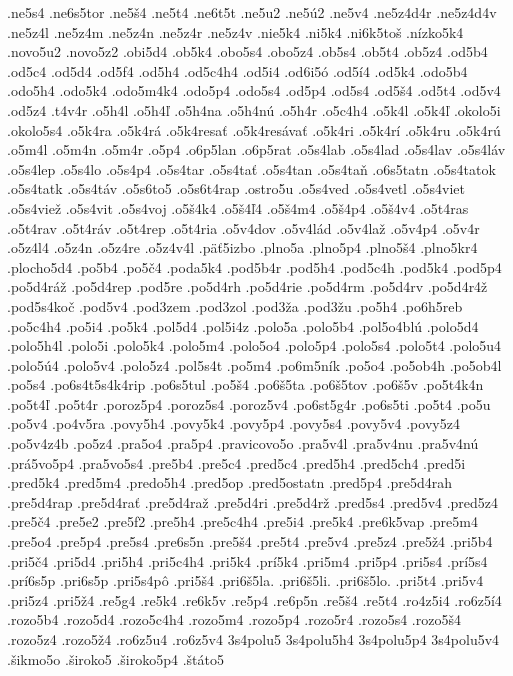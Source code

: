 {.ne5s4
.ne6s5tor
.ne5š4
.ne5t4
.ne6t5t
.ne5u2
.ne5ú2
.ne5v4
.ne5z4d4r
.ne5z4d4v
.ne5z4l
.ne5z4m
.ne5z4n
.ne5z4r
.ne5z4v
.nie5k4
.ni5k4
.ni6k5toš
.nízko5k4
.novo5u2
.novo5z2
.obi5d4
.ob5k4
.obo5s4
.obo5z4
.ob5s4
.ob5t4
.ob5z4
.od5b4
.od5c4
.od5d4
.od5f4
.od5h4
.od5c4h4
.od5i4
.od6i5ó
.od5í4
.od5k4
.odo5b4
.odo5h4
.odo5k4
.odo5m4k4
.odo5p4
.odo5s4
.od5p4
.od5s4
.od5š4
.od5t4
.od5v4
.od5z4
.t4v4r
.o5h4l
.o5h4ľ
.o5h4na
.o5h4nú
.o5h4r
.o5c4h4
.o5k4l
.o5k4ľ
.okolo5i
.okolo5s4
.o5k4ra
.o5k4rá
.o5k4resať
.o5k4resávať
.o5k4ri
.o5k4rí
.o5k4ru
.o5k4rú
.o5m4l
.o5m4n
.o5m4r
.o5p4
.o6p5lan
.o6p5rat
.o5s4lab
.o5s4lad
.o5s4lav
.o5s4láv
.o5s4lep
.o5s4lo
.o5s4p4
.o5s4tar
.o5s4tať
.o5s4tan
.o5s4taň
.o6s5tatn
.o5s4tatok
.o5s4tatk
.o5s4táv
.o5s6to5
.o5s6t4rap
.ostro5u
.o5s4ved
.o5s4vetl
.o5s4viet
.o5s4viež
.o5s4vit
.o5s4voj
.o5š4k4
.o5š4ľ4
.o5š4m4
.o5š4p4
.o5š4v4
.o5t4ras
.o5t4rav
.o5t4ráv
.o5t4rep
.o5t4ria
.o5v4dov
.o5v4lád
.o5v4laž
.o5v4p4
.o5v4r
.o5z4l4
.o5z4n
.o5z4re
.o5z4v4l
.päť5izbo
.plno5a
.plno5p4
.plno5š4
.plno5kr4
.plocho5d4
.po5b4
.po5č4
.poda5k4
.pod5b4r
.pod5h4
.pod5c4h
.pod5k4
.pod5p4
.po5d4ráž
.po5d4rep
.pod5re
.po5d4rh
.po5d4rie
.po5d4rm
.po5d4rv
.po5d4r4ž
.pod5s4koč
.pod5v4
.pod3zem
.pod3zol
.pod3ža
.pod3žu
.po5h4
.po6h5reb
.po5c4h4
.po5i4
.po5k4
.pol5d4
.pol5i4z
.polo5a
.polo5b4
.pol5o4blú
.polo5d4
.polo5h4l
.polo5i
.polo5k4
.polo5m4
.polo5o4
.polo5p4
.polo5s4
.polo5t4
.polo5u4
.polo5ú4
.polo5v4
.polo5z4
.pol5s4t
.po5m4
.po6m5ník
.po5o4
.po5ob4h
.po5ob4l
.po5s4
.po6s4t5s4k4rip
.po6s5tul
.po5š4
.po6š5ta
.po6š5tov
.po6š5v
.po5t4k4n
.po5t4ľ
.po5t4r
.poroz5p4
.poroz5s4
.poroz5v4
.po6st5g4r
.po6s5ti
.po5t4
.po5u
.po5v4
.po4v5ra
.povy5h4
.povy5k4
.povy5p4
.povy5s4
.povy5v4
.povy5z4
.po5v4z4b
.po5z4
.pra5o4
.pra5p4
.pravicovo5o
.pra5v4l
.pra5v4nu
.pra5v4nú
.prá5vo5p4
.pra5vo5s4
.pre5b4
.pre5c4
.pred5c4
.pred5h4
.pred5ch4
.pred5i
.pred5k4
.pred5m4
.predo5h4
.pred5op
.pred5ostatn
.pred5p4
.pre5d4rah
.pre5d4rap
.pre5d4rať
.pre5d4raž
.pre5d4ri
.pre5d4rž
.pred5s4
.pred5v4
.pred5z4
.pre5č4
.pre5e2
.pre5f2
.pre5h4
.pre5c4h4
.pre5i4
.pre5k4
.pre6k5vap
.pre5m4
.pre5o4
.pre5p4
.pre5s4
.pre6s5n
.pre5š4
.pre5t4
.pre5v4
.pre5z4
.pre5ž4
.pri5b4
.pri5č4
.pri5d4
.pri5h4
.pri5c4h4
.pri5k4
.prí5k4
.pri5m4
.pri5p4
.pri5s4
.prí5s4
.prí6s5p
.pri6s5p
.pri5s4pô
.pri5š4
.pri6š5la.
.pri6š5li.
.pri6š5lo.
.pri5t4
.pri5v4
.pri5z4
.pri5ž4
.re5g4
.re5k4
.re6k5v
.re5p4
.re6p5n
.re5š4
.re5t4
.ro4z5i4
.ro6z5í4
.rozo5b4
.rozo5d4
.rozo5c4h4
.rozo5m4
.rozo5p4
.rozo5r4
.rozo5s4
.rozo5š4
.rozo5z4
.rozo5ž4
.ro6z5u4
.ro6z5v4
3s4polu5
3s4polu5h4
3s4polu5p4
3s4polu5v4
.šikmo5o
.široko5
.široko5p4
.štáto5
}
